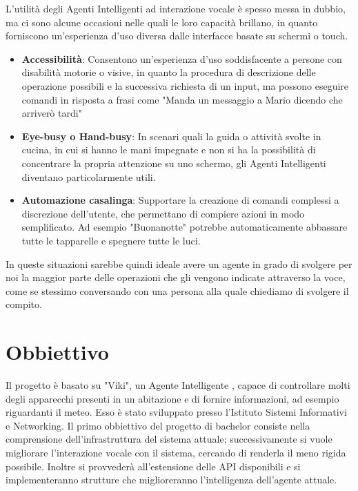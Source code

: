 \documentclass[twoside]{supsistudent}
\begin{document}
L'utilità degli Agenti Intelligenti ad interazione vocale è spesso messa in dubbio, ma ci sono alcune occasioni nelle quali le loro capacità brillano, in quanto forniscono un'esperienza d'uso diversa dalle interfacce basate su schermi o touch.
\begin{itemize}
	\item \textbf{Accessibilità}: Consentono un'esperienza d'uso soddisfacente a persone con disabilità motorie o visive,  in quanto  la procedura di descrizione delle operazione possibili e la successiva richiesta di un input, ma possono eseguire comandi in risposta a frasi come "Manda un messaggio a Mario dicendo che arriverò tardi"
	\item \textbf{Eye-busy o Hand-busy}: In scenari quali la guida o attività svolte in cucina, in cui si hanno le mani impegnate e non si ha la possibilità di concentrare la propria attenzione su uno schermo, gli Agenti Intelligenti diventano particolarmente utili.
	\item \textbf{Automazione casalinga}: Supportare la creazione di comandi complessi a discrezione dell'utente, che permettano di compiere azioni in modo semplificato. Ad esempio "Buonanotte" potrebbe automaticamente abbassare tutte le tapparelle e spegnere tutte le luci.
\end{itemize}
In queste situazioni sarebbe quindi ideale avere un agente in grado di svolgere per noi la maggior parte delle operazioni che gli vengono indicate attraverso la voce, come se stessimo conversando con una persona alla quale chiediamo di svolgere il compito.

\chapter{Obbiettivo}

Il progetto è basato su "Viki", un Agente Intelligente , capace di controllare molti degli apparecchi presenti in un abitazione e di fornire informazioni, ad esempio riguardanti il meteo.
Esso è stato sviluppato presso l'Istituto Sistemi Informativi e Networking. 
Il primo obbiettivo del progetto di bachelor consiste nella comprensione dell'infrastruttura del sistema attuale; successivamente si  vuole migliorare l'interazione vocale con il sistema, cercando di renderla il meno rigida possibile. Inoltre si provvederà all'estensione delle API disponibili e si implementeranno strutture che miglioreranno l'intelligenza dell'agente attuale.
\end{document}
